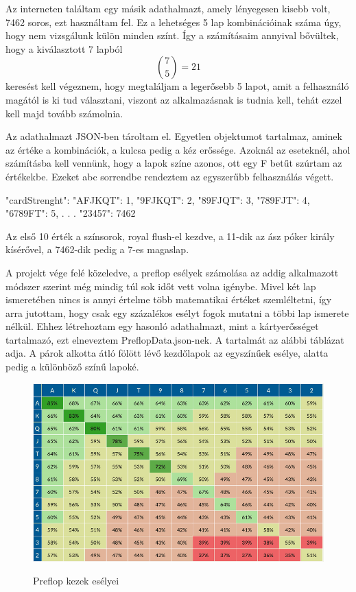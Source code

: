 Az interneten találtam egy másik adathalmazt, amely lényegesen kisebb volt, 7462 soros, ezt használtam fel. 
\cite{chances}
Ez a lehetséges 5 lap kombinációinak száma úgy, hogy nem vizsgálunk külön minden színt. Így a számításaim annyival bővültek, hogy a kiválasztott 7 lapból \[ \binom{7}{5}=21\] keresést kell végeznem, hogy megtaláljam a legerősebb 5 lapot, amit a felhasználó magától is ki tud választani, viszont az alkalmazásnak is tudnia kell, tehát ezzel kell majd tovább számolnia.

Az adathalmazt JSON-ben tároltam el. Egyetlen objektumot tartalmaz, aminek az értéke a kombinációk, a kulcsa pedig a kéz erőssége. Azoknál az eseteknél, ahol számításba kell vennünk, hogy a lapok színe azonos, ott egy F betűt szúrtam az értékekbe. Ezeket abc sorrendbe rendeztem az egyszerűbb felhasználás végett.

\begin{python}
{
  "cardStrenght": {
    "AFJKQT": 1,
    "9FJKQT": 2,
    "89FJQT": 3,
    "789FJT": 4,
    "6789FT": 5,
    .
    .
    .
    "23457": 7462
    }
}
\end{python}

Az első 10 érték a színsorok, royal flush-el kezdve, a 11-dik az ász póker király kísérővel, a 7462-dik pedig a 7-es magaslap.

A projekt vége felé közeledve, a preflop esélyek számolása az addig alkalmazott módszer szerint még mindig túl sok időt vett volna igénybe. Mivel két lap ismeretében nincs is annyi értelme több matematikai értéket szemléltetni, így arra jutottam, hogy csak egy százalékos esélyt fogok mutatni a többi lap ismerete nélkül. Ehhez létrehoztam egy hasonló adathalmazt, mint a kártyerősséget tartalmazó, ezt elneveztem PreflopData.json-nek. A tartalmát az alábbi táblázat adja. A párok alkotta átló fölött lévő kezdőlapok az egyszínűek esélye, alatta pedig a különböző színű lapoké.

\begin{figure}[h]
\centering
\includegraphics[scale=0.5]{images/preflop-chances.png}
\caption{Preflop kezek esélyei}
\cite{preflop-chances}
\label{fig:preflop-chances}
\end{figure}

